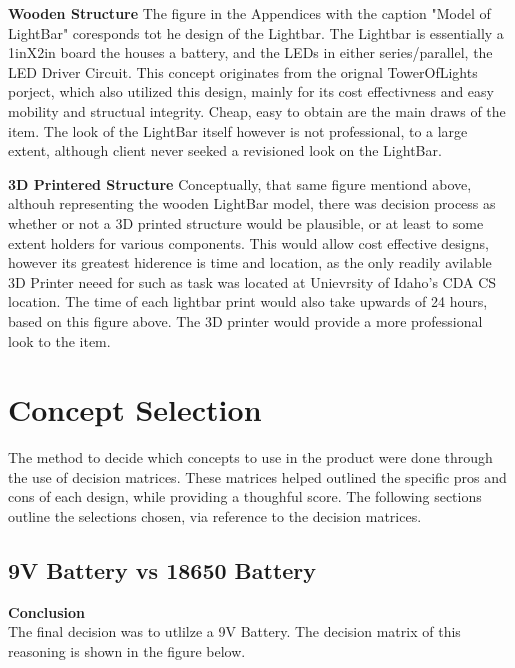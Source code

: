 \documentclass[12pt]{article}
\begin{document}
{{{			\textbf{Wooden Structure}
			The figure in the Appendices with the caption "Model of LightBar" coresponds tot he design of the Lightbar. The Lightbar is essentially a 1inX2in board the houses a battery, and the LEDs in either series/parallel, the LED Driver Circuit. This concept originates from the orignal TowerOfLights porject, which also utilized this design, mainly for its cost effectivness and easy mobility and structual integrity. Cheap, easy to obtain are the main draws of the item. The look of the LightBar itself however is not professional, to a large extent, although client never seeked a revisioned look on the LightBar.
			
			
			\noindent \textbf{3D Printered Structure}
			Conceptually, that same figure mentiond above, althouh representing the wooden LightBar model, there was decision process as whether or not a 3D printed structure would be plausible, or at least to some extent holders for various components. This would allow cost effective designs, however its greatest hiderence is time and location, as the only readily avilable 3D Printer neeed for such as task was located at Unievrsity of Idaho's CDA CS location. The time of each lightbar print would also take upwards of 24 hours, based on this figure above. The 3D printer would provide a more professional look to the item.
			
			\newpage
	
	\section{Concept Selection}
	The method to decide which concepts to use in the product were done through the use of decision matrices. These matrices helped outlined the specific pros and cons of each design, while providing a thoughful score. The following sections outline the selections chosen, via reference to the decision matrices.
	
		\subsection{9V Battery vs 18650 Battery}
			
			\noindent\textbf{Conclusion}\\
				The final decision was to utlilze a 9V Battery. The decision matrix of this reasoning is shown in the figure below.
				
}}}
\end{document}
